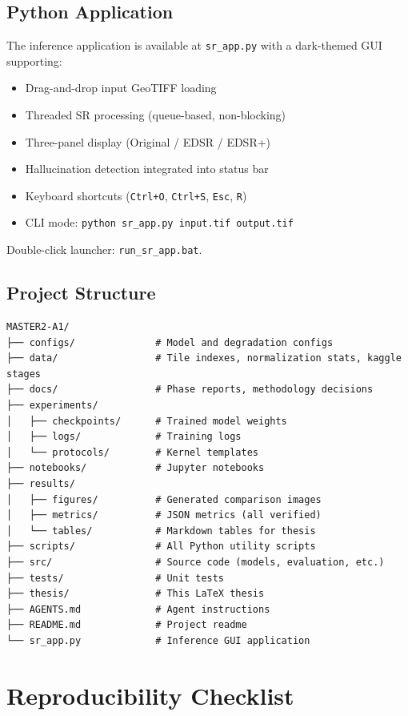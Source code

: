 \documentclass[12pt,a4paper]{report}
\begin{document}
\section{Python Application}
The inference application is available at \texttt{sr\_app.py} with a dark-themed GUI supporting:
\begin{itemize}
    \item Drag-and-drop input GeoTIFF loading
    \item Threaded SR processing (queue-based, non-blocking)
    \item Three-panel display (Original / EDSR / EDSR+)
    \item Hallucination detection integrated into status bar
    \item Keyboard shortcuts (\texttt{Ctrl+O}, \texttt{Ctrl+S}, \texttt{Esc}, \texttt{R})
    \item CLI mode: \texttt{python sr\_app.py input.tif output.tif}
\end{itemize}
Double-click launcher: \texttt{run\_sr\_app.bat}.

\section{Project Structure}
\begin{verbatim}
MASTER2-A1/
├── configs/              # Model and degradation configs
├── data/                 # Tile indexes, normalization stats, kaggle stages
├── docs/                 # Phase reports, methodology decisions
├── experiments/
│   ├── checkpoints/      # Trained model weights
│   ├── logs/             # Training logs
│   └── protocols/        # Kernel templates
├── notebooks/            # Jupyter notebooks
├── results/
│   ├── figures/          # Generated comparison images
│   ├── metrics/          # JSON metrics (all verified)
│   └── tables/           # Markdown tables for thesis
├── scripts/              # All Python utility scripts
├── src/                  # Source code (models, evaluation, etc.)
├── tests/                # Unit tests
├── thesis/               # This LaTeX thesis
├── AGENTS.md             # Agent instructions
├── README.md             # Project readme
└── sr_app.py             # Inference GUI application
\end{verbatim}

\chapter{Reproducibility Checklist}
\end{document}
